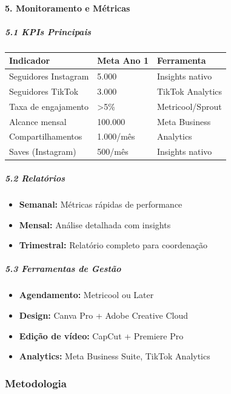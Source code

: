 \bigskip

\paragraph{5. Monitoramento e Métricas}

\subparagraph{5.1 KPIs Principais}

\bigskip\noindent
\begin{tabular}{p{}p{}p{}}
\toprule
Indicador & Meta Ano 1 & Ferramenta \\
\hline
Seguidores Instagram & 5.000 & Insights nativo \\
Seguidores TikTok & 3.000 & TikTok Analytics \\
Taxa de engajamento & \textgreater 5\% & Metricool/Sprout \\
Alcance mensal & 100.000 & Meta Business \\
Compartilhamentos & 1.000/mês & Analytics \\
Saves (Instagram) & 500/mês & Insights nativo \\
\bottomrule
\end{tabular}

\bigskip

\subparagraph{5.2 Relatórios}

\begin{itemize}
\item \textbf{Semanal:} Métricas rápidas de performance
\item \textbf{Mensal:} Análise detalhada com insights
\item \textbf{Trimestral:} Relatório completo para coordenação
\end{itemize}

\subparagraph{5.3 Ferramentas de Gestão}

\begin{itemize}
\item \textbf{Agendamento:} Metricool ou Later
\item \textbf{Design:} Canva Pro + Adobe Creative Cloud
\item \textbf{Edição de vídeo:} CapCut + Premiere Pro
\item \textbf{Analytics:} Meta Business Suite, TikTok Analytics
\end{itemize}

\subsubsection{Metodologia}

